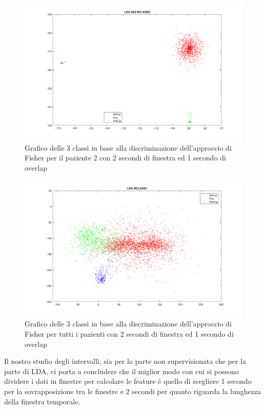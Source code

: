 \begin{figure}[]
	\centering
	\includegraphics[width=1\textwidth]{images/LDAS02_best.png}
	\caption{Grafico delle 3 classi in base alla discriminazione dell'approccio di Fisher per il paziente 2 con 2 secondi di finestra ed 1 secondo di overlap}
	\label{LDAS02_best.png}
\end{figure}
\begin{figure}[]
	\centering
	\includegraphics[width=1\textwidth]{images/LDAALL2.png}
	\caption{Grafico delle 3 classi in base alla discriminazione dell'approccio di Fisher per tutti i pazienti con 2 secondi di finestra ed 1 secondo di overlap}
	\label{LDAALL2.png}
\end{figure}
Il nostro studio degli intervalli, sia per la parte non supervisionata che per la parte di LDA, ci porta a concludere che il miglior modo con cui si possono dividere i dati in finestre per calcolare le feature é quello di scegliere 1 secondo per la sovrapposizione tra le finestre e 2 secondi per quanto riguarda la lunghezza della finestra temporale.

